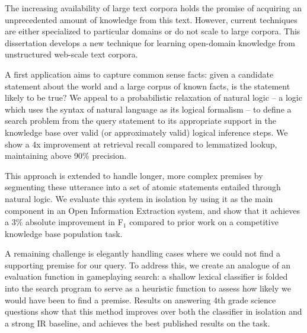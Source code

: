 
The increasing availability of large text corpora holds the promise of acquiring an 
  unprecedented amount of knowledge from this text.
However, current techniques are either specialized to particular domains or do not 
  scale to large corpora.
This dissertation develops a new technique for learning open-domain knowledge from 
  unstructured web-scale text corpora.

A first application aims to capture common sense facts: given a candidate statement 
  about the world and a large corpus of known facts, is the statement likely to be true? 
We appeal to a probabilistic relaxation of natural logic -- a logic which uses the syntax of 
  natural language as its logical formalism -- to define a search problem from the query 
  statement to its appropriate support in the knowledge base over valid (or approximately 
  valid) logical inference steps.
We show a 4x improvement at retrieval recall compared to lemmatized lookup, maintaining 
  above 90\% precision.

This approach is extended to handle longer, more complex premises by segmenting these 
  utterance into a set of atomic statements entailed through natural logic.
We evaluate this system in isolation by using it as the main component in an Open Information 
  Extraction system, and show that it achieves a 3\% absolute improvement in F$_1$ compared to 
  prior work on a competitive knowledge base population task.

A remaining challenge is elegantly handling cases where we could not find a supporting 
  premise for our query.
To address this, we create an analogue of an evaluation function in gameplaying search: 
  a shallow lexical classifier is folded into the search program to serve as a heuristic 
  function to assess how likely we would have been to find a premise.
Results on answering 4th grade science questions show that this method improves over 
  both the classifier in isolation and a strong IR baseline, and achieves the best published 
  results on the task.
